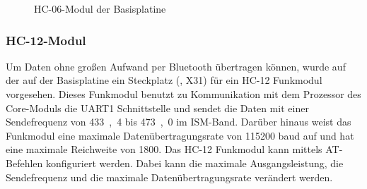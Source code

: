 \begin{figure}[htb]
    \centering
    \qquad
    \qquad
    \caption[HC-06-Modul der Basisplatine]{HC-06-Modul der \gls{Basisplatine}}
    \label{fig:basisplatine-hc06}
\end{figure}

\subsubsection{HC-12-Modul \cite{basis:hc12}}
Um Daten ohne großen Aufwand per Bluetooth übertragen können, wurde auf der auf der \gls{Basisplatine} ein Steckplatz (, X31) für ein HC-12 Funkmodul vorgesehen. Dieses Funkmodul benutzt zu Kommunikation mit dem Prozessor des \gls{Core-Modul}s die UART1 Schnittstelle und sendet die Daten mit einer Sendefrequenz von \unit{433,4}{\mega\hertz} bis \unit{473,0}{\mega\hertz} im ISM-Band. Darüber hinaus weist das Funkmodul eine maximale Datenübertragungsrate von 115200 baud auf und hat eine maximale Reichweite von \unit{1800}{\metre}. Das HC-12 Funkmodul kann mittels AT-Befehlen konfiguriert werden. Dabei kann die maximale Ausgangsleistung, die Sendefrequenz und die maximale Datenübertragungsrate verändert werden.

